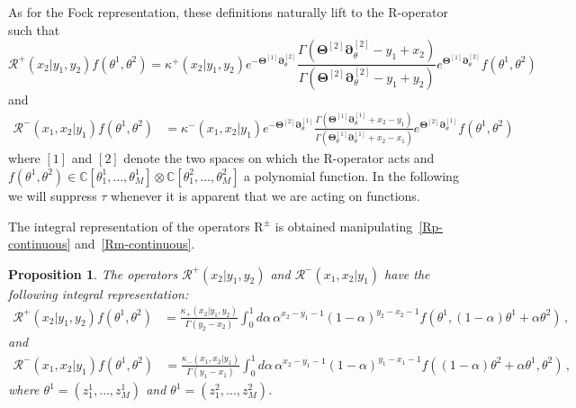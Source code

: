 \documentclass[11pt]{article}
\numberwithin{equation}{section}
\newtheorem{proposition}[theorem]{Proposition}
\newcommand{\M}{M}
\newcommand{\abrOSCR}{\mathrm{R}}
\newcommand{\ecR}{\bm{\mathscr{R}}}
\newcommand{\hidden}{\theta}
\newcommand{\Hidden}{\Theta}
\newcommand{\rep}{\tau}
\begin{document}
As for the Fock representation, these definitions naturally lift to the R-operator such that
 \begin{equation}\label{Rp-continuous}
			\ecR ^+(x_2|y_1,y_2)f(\hidden^{1},\hidden^{2}) =\kappa^+(x_2|y_1,y_2)e^{-\bm{\Hidden}^{[1]}\bm{\partial}_{\hidden}^{[2]}}\frac{\Gamma(\bm{\Hidden}^{[2]}\bm{\partial}_{\hidden}^{[2]}-y_1+x_2)}{\Gamma(\bm{\Hidden}^{[2]}\bm{\partial}_{\hidden}^{[2]}-y_1+y_2)}e^{\bm{\Hidden}^{[1]}\bm{\partial}_{\hidden}^{[2]}}f(\hidden^{1},\hidden^{2})
		\end{equation}
        and
    \begin{equation}\label{Rm-continuous}
		\begin{split}
\ecR ^{-}(x_{1},x_{2}|y_{1})f(\hidden^{1},\hidden^{2}
)&=\kappa^{-}(x_{1},x_2|y_{1})e^{-\bm{\Hidden}^{[2]}\bm{\partial}_{\hidden}^{[1]}}\frac{\Gamma\left(\bm{\Hidden}^{[1]}\bm{\partial}_{\hidden}^{[1]}+x_{2}-y_{1}\right)}{\Gamma\left(\bm{\Hidden}_{\hidden}^{[1]}\bm{\partial}_{\hidden}^{[1]}+x_{2}-x_{1}\right)}e^{\bm{\Hidden}^{[2]}\bm{\partial}_{\hidden}^{[1]}}f(\hidden^{1},\hidden^{2})
		\end{split}
	\end{equation}
  	where $[1]$ and $[2]$ denote the two spaces on which the R-operator acts and $f(\hidden^1,\hidden^2)\in \mathbb{C}[\hidden^1_1,\ldots,\hidden^1_M]\otimes \mathbb{C}[\hidden^2_1,\ldots,\hidden^2_M]$ a polynomial function. In the following we will suppress $\rep$ whenever it is apparent that we are acting on functions.

	The integral representation of the operators $\abrOSCR^\pm$ is obtained manipulating~\eqref{Rp-continuous} and~\eqref{Rm-continuous}.
	\begin{proposition}\label{proposition-intergrtalReps}
		The  operators $\ecR ^{+}(x_{2}|y_{1},y_{2})$ and $\ecR ^{-}(x_{1},x_{2}|y_{1})$ have the following integral representation:
        		\begin{equation}\label{redR2sl2int}
			\begin{split}
				\ecR ^+(x_2|y_1,y_2) f(\hidden^{1},\hidden^{2})&=\frac{\kappa_+(x_{2}|y_{1},y_{2})}{ \Gamma(y_2-x_2)} \int_0^1d\alpha\, \alpha^{x_2-y_1-1}(1-\alpha)^{y_2-x_2-1}  f(\hidden^{1},(1-\alpha)\hidden^{1}+\alpha \hidden^{2})\,,
			\end{split}
		\end{equation}
		and
		\begin{equation}\label{redR2sl2int2}
			\begin{split}
				\ecR ^-(x_1,x_2|y_1) f(\hidden^{1},\hidden^{2})&=\frac{\kappa_-(x_{1},x_2|y_{1})}{ \Gamma(y_1-x_1)}  \int_0^1d\alpha\,\alpha^{x_2-y_1-1}(1-\alpha)^{y_1-x_1-1}  f((1-\alpha)\hidden^{2}+\alpha \hidden^{1},\hidden^{2})\,,
			\end{split}
		\end{equation}
																							where $\hidden^{1}=(z_{1}^{1},\ldots,z_{\M}^{1})$ and $\hidden^{1}=(z_{1}^{2},\ldots,z_{\M}^{2})$.	\end{proposition}
\end{document}
